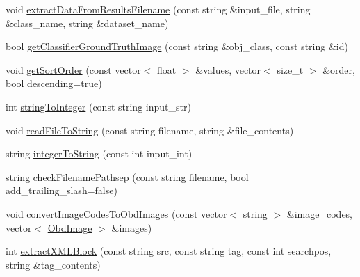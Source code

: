 \begin{DoxyCompactItemize}
\item 
void \hyperlink{classVocData_a12f52ec04b326eed957b02883f8da836}{extract\-Data\-From\-Results\-Filename} (const string \&input\-\_\-file, string \&class\-\_\-name, string \&dataset\-\_\-name)
\item 
bool \hyperlink{classVocData_a1d313e61c54cf27ec2500b38d9f16eda}{get\-Classifier\-Ground\-Truth\-Image} (const string \&obj\-\_\-class, const string \&id)
\item 
void \hyperlink{classVocData_aecc9f83f5e0ab63fc09e60679982342d}{get\-Sort\-Order} (const vector$<$ float $>$ \&values, vector$<$ size\-\_\-t $>$ \&order, bool descending=true)
\item 
int \hyperlink{classVocData_aecd0e31768fb9a202224d0dde4a05178}{string\-To\-Integer} (const string input\-\_\-str)
\item 
void \hyperlink{classVocData_aa556074b41f8f5a1ac611b6b4fa06c2d}{read\-File\-To\-String} (const string filename, string \&file\-\_\-contents)
\item 
string \hyperlink{classVocData_afcc3d337fc5c33e53cdaef5f8589ac1d}{integer\-To\-String} (const int input\-\_\-int)
\item 
string \hyperlink{classVocData_a33d4a839f14d65bc5f4bdb4e89d625d1}{check\-Filename\-Pathsep} (const string filename, bool add\-\_\-trailing\-\_\-slash=false)
\item 
void \hyperlink{classVocData_a9542ea7c7c7d2f500637b7e4dbee8de8}{convert\-Image\-Codes\-To\-Obd\-Images} (const vector$<$ string $>$ \&image\-\_\-codes, vector$<$ \hyperlink{classObdImage}{Obd\-Image} $>$ \&images)
\item 
int \hyperlink{classVocData_a9509a28cfed76d7f8a4c1768462a01a9}{extract\-X\-M\-L\-Block} (const string src, const string tag, const int searchpos, string \&tag\-\_\-contents)
\end{DoxyCompactItemize}
